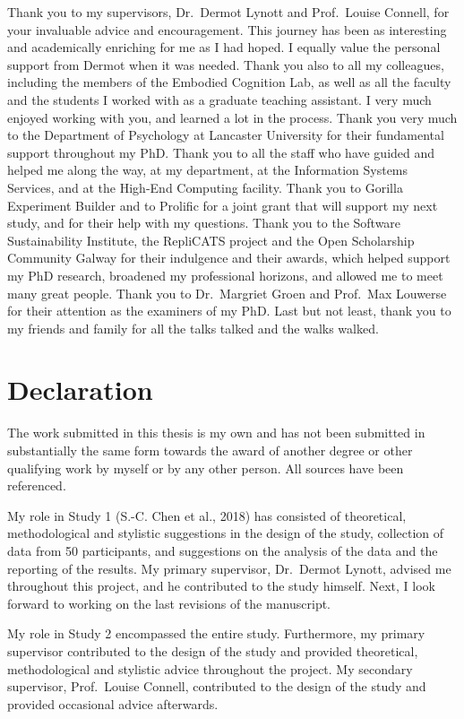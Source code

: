 \documentclass[
  12pt,
  man,floatsintext]{apa7}
\begin{document}
Thank you to my supervisors, Dr.~Dermot Lynott and Prof.~Louise Connell, for your invaluable advice and encouragement. This journey has been as interesting and academically enriching for me as I had hoped. I equally value the personal support from Dermot when it was needed. Thank you also to all my colleagues, including the members of the Embodied Cognition Lab, as well as all the faculty and the students I worked with as a graduate teaching assistant. I very much enjoyed working with you, and learned a lot in the process. Thank you very much to the Department of Psychology at Lancaster University for their fundamental support throughout my PhD. Thank you to all the staff who have guided and helped me along the way, at my department, at the Information Systems Services, and at the High-End Computing facility. Thank you to Gorilla Experiment Builder and to Prolific for a joint grant that will support my next study, and for their help with my questions. Thank you to the Software Sustainability Institute, the RepliCATS project and the Open Scholarship Community Galway for their indulgence and their awards, which helped support my PhD research, broadened my professional horizons, and allowed me to meet many great people. Thank you to Dr.~Margriet Groen and Prof.~Max Louwerse for their attention as the examiners of my PhD. Last but not least, thank you to my friends and family for all the talks talked and the walks walked.

\newpage

\hypertarget{declaration}{%
\section{Declaration}\label{declaration}}

The work submitted in this thesis is my own and has not been submitted in substantially the same form towards the award of another degree or other qualifying work by myself or by any other person. All sources have been referenced.

My role in Study 1 (S.-C. Chen et al., 2018) has consisted of theoretical, methodological and stylistic suggestions in the design of the study, collection of data from 50 participants, and suggestions on the analysis of the data and the reporting of the results. My primary supervisor, Dr.~Dermot Lynott, advised me throughout this project, and he contributed to the study himself. Next, I look forward to working on the last revisions of the manuscript.

My role in Study 2 encompassed the entire study. Furthermore, my primary supervisor contributed to the design of the study and provided theoretical, methodological and stylistic advice throughout the project. My secondary supervisor, Prof.~Louise Connell, contributed to the design of the study and provided occasional advice afterwards.
\end{document}
